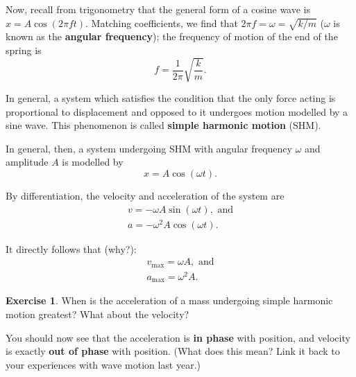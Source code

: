 \documentclass[a4paper]{amsbook}
\theoremstyle{definition}
\newtheorem{exercise}{Exercise}
\numberwithin{exercise}{chapter}
\numberwithin{exercise}{chapter}
\begin{document}
Now, recall from trigonometry that the general form of a cosine wave is $ x = A \cos(2\pi f t) $. Matching coefficients,
we find that $ 2\pi f = \omega = \sqrt{k/m} $ ($ \omega $ is known as the \textbf{angular frequency}); the frequency of
motion of the end of the spring is
\begin{equation}
  f = \frac{1}{2\pi} \sqrt{\frac{k}{m}}.
\end{equation}

In general, a system which satisfies the condition that the only force acting is proportional to displacement and opposed to
it undergoes motion modelled by a sine wave. This phenomenon is called \textbf{simple harmonic motion} (SHM).

In general, then, a system undergoing SHM with angular frequency $ \omega $ and amplitude $ A $ is modelled by
\begin{equation}
  x = A \cos (\omega t).
\end{equation}

By differentiation, the velocity and acceleration of the system are
\begin{gather}
  v = -\omega A \sin (\omega t), \text{ and}\\
  a = -\omega^2 A \cos (\omega t).
\end{gather}

It directly follows that (why?):
\begin{gather}
  v_\text{max} = \omega A, \text{ and}\\
  a_\text{max} = \omega^2 A.
\end{gather}

\begin{exercise}
  When is the acceleration of a mass undergoing simple harmonic motion greatest? What about the velocity?
\end{exercise}

You should now see that the acceleration is \textbf{in phase} with position, and velocity is exactly \textbf{out of phase}
with position. (What does this mean? Link it back to your experiences with wave motion last year.)
\end{document}
